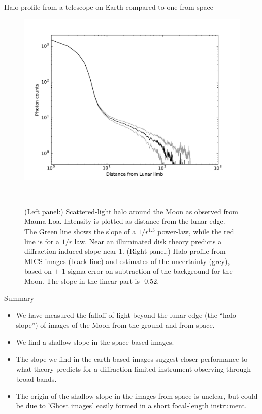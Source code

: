 \documentclass[final,hyperref={pdfpagelabels=false}]{beamer}
\begin{document}
\begin{frame}[t]
\begin{columns}[t]
\begin{column}{.23\textwidth}
\begin{block}{Halo profile from a telescope on Earth compared to one from space}
\begin{figure}
\includegraphics[scale=.6]{fig/fl-moon.pdf}
\caption{ (Left panel:) Scattered-light halo around the Moon as observed from Mauna Loa. Intensity is plotted as distance from the lunar edge. The Green line shows the slope of a $1/r^{1.3}$ power-law, while the red line is for a $1/r$ law. Near an illuminated disk theory predicts a diffraction-induced slope near 1. (Right panel:) Halo profile from MICS images (black line) and estimates of the uncertainty (grey), based on $\pm$ 1 sigma error on subtraction of the background for the Moon. The slope in the linear part is -0.52. }~\label{fig:MLOresult}
\end{figure}

\end{block}
\begin{block}{Summary}
\begin{itemize}
    \item We have measured the falloff of light beyond the lunar edge (the ``halo-slope'') of images of the Moon from the ground and from space.
    \item We find a shallow slope in the space-based images.
    \item The slope we find in the earth-based images suggest closer performance to what theory predicts for a diffraction-limited instrument observing through broad bands.
    \item The origin of the shallow slope in the images from space is unclear, but could be due to 'Ghost images' easily formed in a short focal-length instrument.
\end{itemize}

\end{block}


\end{column}
\end{columns}
\end{frame}
\end{document}
